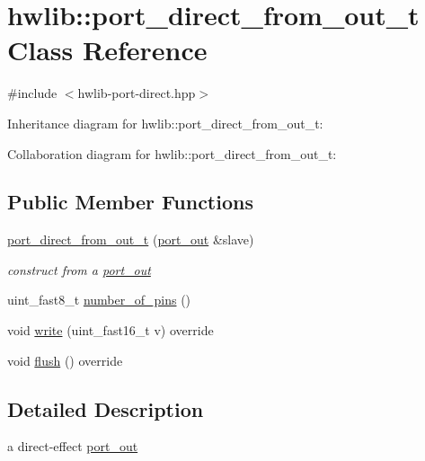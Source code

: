 \hypertarget{classhwlib_1_1port__direct__from__out__t}{}\section{hwlib\+:\+:port\+\_\+direct\+\_\+from\+\_\+out\+\_\+t Class Reference}
\label{classhwlib_1_1port__direct__from__out__t}


{\ttfamily \#include $<$hwlib-\/port-\/direct.\+hpp$>$}



Inheritance diagram for hwlib\+:\+:port\+\_\+direct\+\_\+from\+\_\+out\+\_\+t\+:


Collaboration diagram for hwlib\+:\+:port\+\_\+direct\+\_\+from\+\_\+out\+\_\+t\+:
\subsection*{Public Member Functions}
\begin{DoxyCompactItemize}
\item 
\mbox{\label{classhwlib_1_1port__direct__from__out__t_a4a48602cd01d0fab20c16747596ddbad}} 
\hyperlink{classhwlib_1_1port__direct__from__out__t_a4a48602cd01d0fab20c16747596ddbad}{port\+\_\+direct\+\_\+from\+\_\+out\+\_\+t} (\hyperlink{classhwlib_1_1port__out}{port\+\_\+out} \&slave)
\begin{DoxyCompactList}\small\item\em construct from a \hyperlink{classhwlib_1_1port__out}{port\+\_\+out} \end{DoxyCompactList}\item 
uint\+\_\+fast8\+\_\+t \hyperlink{classhwlib_1_1port__direct__from__out__t_a3204fe9520fd12fcb155362e22629443}{number\+\_\+of\+\_\+pins} ()
\item 
void \hyperlink{classhwlib_1_1port__direct__from__out__t_a1548ef3dcb6d110a5b58e3698325ca11}{write} (uint\+\_\+fast16\+\_\+t v) override
\item 
void \hyperlink{classhwlib_1_1port__direct__from__out__t_a6fab0d2c9bdf82590bd385bbaadf6bc3}{flush} () override
\end{DoxyCompactItemize}


\subsection{Detailed Description}
a direct-\/effect \hyperlink{classhwlib_1_1port__out}{port\+\_\+out}

